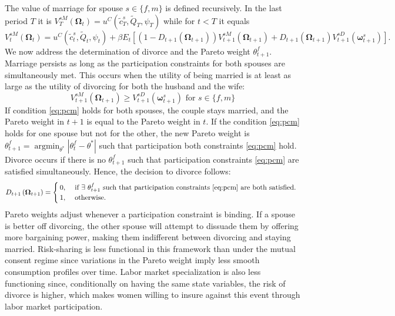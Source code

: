 \documentclass[12pt]{article}
\numberwithin{table}{section}
\begin{document}
The value of marriage for spouse $s \in\{f, m\}$ is defined recursively. In the last period $T$ it is $V_T^{sM}(\boldsymbol{\Omega}_{t})=u^C(\tilde{c}_T^{s}, \tilde{Q}_T, \psi_T)$ while for $t<T$ it equals
$$
V_t^{sM}(\boldsymbol{\Omega}_t)=u^C(\tilde{c}_t^{s}, \tilde{Q}_t, \psi_t)+\beta E_t\left[(1-D_{t+1}(\boldsymbol{\Omega}_{t + 1})) V_{t+1}^{sM}(\boldsymbol{\Omega}_{t+1})+D_{t+1}(\boldsymbol{\Omega}_{t + 1}) V_{t+1}^{sD}(\boldsymbol{\omega}_{t+1}^s)\right].
$$
We now address the determination of divorce and the Pareto weight $\theta_{t+1}^f$. Marriage persists as long as the participation constraints for both spouses are simultaneously met. This occurs when the utility of being married is at least as large as the utility of divorcing for both the husband and the wife:
\begin{equation}\label{eq:pcm}
	V_{t+1}^{sM}(\boldsymbol{\Omega}_{t+1}) \geq V_{t+1}^{sD}(\boldsymbol{\omega}_{t+1}^s)  \text { for } s \in\{f, m\}
\end{equation}
If condition \eqref{eq:pcm} holds for both spouses, the couple stays married, and the Pareto weight in $t+1$ is equal to the Pareto weight in $t$. If the condition \eqref{eq:pcm} holds for one spouse but not for the other, the new Pareto weight is $\theta_{t+1}^f=\operatorname{argmin}_{\theta^*}\left|\theta_t^f-\theta^*\right|$ such that participation both constraints \eqref{eq:pcm} hold. Divorce occurs if there is no $\theta_{t+1}^f$ such that participation constraints \eqref{eq:pcm}  are satisfied simultaneously. Hence, the decision to divorce follows:
$$
D_{t+1}\left(\boldsymbol{\Omega}_{t+1}\right)= \begin{cases}0, & \text{ if } \exists \ \theta_{t+1}^f  \text{ such that participation constraints \eqref{eq:pcm} are both satisfied. } \\ 1, & \text{ otherwise. }\end{cases}
$$
Pareto weights adjust whenever a participation constraint is binding. If a spouse is better off divorcing, the other spouse will attempt to dissuade them by offering more bargaining power, making them indifferent between divorcing and staying married. Risk-sharing is less functional in this framework than under the mutual consent regime since variations in the Pareto weight imply less smooth consumption profiles over time. Labor market specialization is also less functioning since, conditionally on having the same state variables, the risk of divorce is higher, which makes women willing to insure against this event through labor market participation. 
\end{document}

